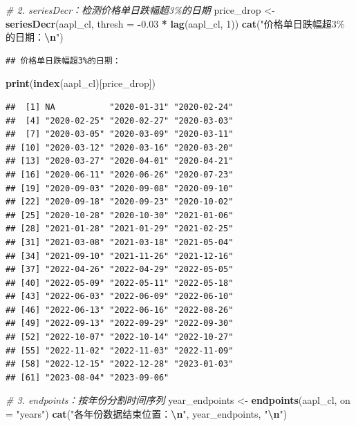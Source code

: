 \documentclass[]{ctexbook}
\newenvironment{Shaded}{\begin{snugshade}}{\end{snugshade}}
\newcommand{\AttributeTok}[1]{\textcolor[rgb]{0.13,0.29,0.53}{#1}}
\newcommand{\CommentTok}[1]{\textcolor[rgb]{0.56,0.35,0.01}{\textit{#1}}}
\newcommand{\DecValTok}[1]{\textcolor[rgb]{0.00,0.00,0.81}{#1}}
\newcommand{\FloatTok}[1]{\textcolor[rgb]{0.00,0.00,0.81}{#1}}
\newcommand{\FunctionTok}[1]{\textcolor[rgb]{0.13,0.29,0.53}{\textbf{#1}}}
\newcommand{\NormalTok}[1]{#1}
\newcommand{\OtherTok}[1]{\textcolor[rgb]{0.56,0.35,0.01}{#1}}
\newcommand{\SpecialCharTok}[1]{\textcolor[rgb]{0.81,0.36,0.00}{\textbf{#1}}}
\newcommand{\StringTok}[1]{\textcolor[rgb]{0.31,0.60,0.02}{#1}}
\begin{document}
\begin{Shaded}
\begin{Highlighting}[]
\CommentTok{\# 2. seriesDecr：检测价格单日跌幅超3\%的日期}
\NormalTok{price\_drop }\OtherTok{\textless{}{-}} \FunctionTok{seriesDecr}\NormalTok{(aapl\_cl, }\AttributeTok{thresh =} \SpecialCharTok{{-}}\FloatTok{0.03} \SpecialCharTok{*} \FunctionTok{lag}\NormalTok{(aapl\_cl, }\DecValTok{1}\NormalTok{))}
\FunctionTok{cat}\NormalTok{(}\StringTok{"价格单日跌幅超3\%的日期：}\SpecialCharTok{\textbackslash{}n}\StringTok{"}\NormalTok{)}
\end{Highlighting}
\end{Shaded}

\begin{verbatim}
## 价格单日跌幅超3%的日期：
\end{verbatim}

\begin{Shaded}
\begin{Highlighting}[]
\FunctionTok{print}\NormalTok{(}\FunctionTok{index}\NormalTok{(aapl\_cl)[price\_drop])}
\end{Highlighting}
\end{Shaded}

\begin{verbatim}
##  [1] NA           "2020-01-31" "2020-02-24"
##  [4] "2020-02-25" "2020-02-27" "2020-03-03"
##  [7] "2020-03-05" "2020-03-09" "2020-03-11"
## [10] "2020-03-12" "2020-03-16" "2020-03-20"
## [13] "2020-03-27" "2020-04-01" "2020-04-21"
## [16] "2020-06-11" "2020-06-26" "2020-07-23"
## [19] "2020-09-03" "2020-09-08" "2020-09-10"
## [22] "2020-09-18" "2020-09-23" "2020-10-02"
## [25] "2020-10-28" "2020-10-30" "2021-01-06"
## [28] "2021-01-28" "2021-01-29" "2021-02-25"
## [31] "2021-03-08" "2021-03-18" "2021-05-04"
## [34] "2021-09-10" "2021-11-26" "2021-12-16"
## [37] "2022-04-26" "2022-04-29" "2022-05-05"
## [40] "2022-05-09" "2022-05-11" "2022-05-18"
## [43] "2022-06-03" "2022-06-09" "2022-06-10"
## [46] "2022-06-13" "2022-06-16" "2022-08-26"
## [49] "2022-09-13" "2022-09-29" "2022-09-30"
## [52] "2022-10-07" "2022-10-14" "2022-10-27"
## [55] "2022-11-02" "2022-11-03" "2022-11-09"
## [58] "2022-12-15" "2022-12-28" "2023-01-03"
## [61] "2023-08-04" "2023-09-06"
\end{verbatim}

\begin{Shaded}
\begin{Highlighting}[]
\CommentTok{\# 3. endpoints：按年份分割时间序列}
\NormalTok{year\_endpoints }\OtherTok{\textless{}{-}} \FunctionTok{endpoints}\NormalTok{(aapl\_cl, }\AttributeTok{on =} \StringTok{"years"}\NormalTok{)}
\FunctionTok{cat}\NormalTok{(}\StringTok{"各年份数据结束位置：}\SpecialCharTok{\textbackslash{}n}\StringTok{"}\NormalTok{, year\_endpoints, }\StringTok{"}\SpecialCharTok{\textbackslash{}n}\StringTok{"}\NormalTok{)}
\end{Highlighting}
\end{Shaded}
\end{document}
